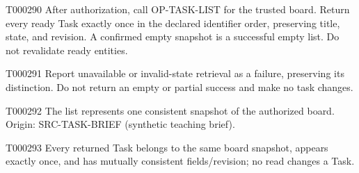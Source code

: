 \documentclass[11pt,a4paper]{article}
\begin{document}
\begin{atlasparagraph}{T000290}
After authorization, call OP-TASK-LIST for the trusted board. Return every ready Task exactly once in the declared identifier order, preserving title, state, and revision. A confirmed empty snapshot is a successful empty list. Do not revalidate ready entities.
\end{atlasparagraph}
\begin{atlasparagraph}{T000291}
Report unavailable or invalid-state retrieval as a failure, preserving its distinction. Do not return an empty or partial success and make no task changes.
\end{atlasparagraph}
\begin{atlasparagraph}{T000292}
The list represents one consistent snapshot of the authorized board. Origin: SRC-TASK-BRIEF (synthetic teaching brief).
\end{atlasparagraph}
\begin{atlasparagraph}{T000293}
Every returned Task belongs to the same board snapshot, appears exactly once, and has mutually consistent fields/revision; no read changes a Task.
\end{atlasparagraph}
\end{document}
